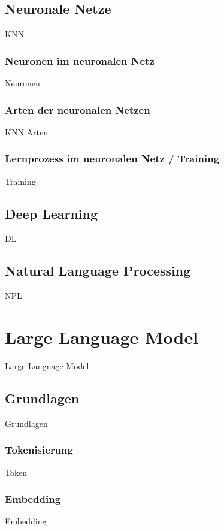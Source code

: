 
\subsection{Neuronale Netze}
KNN

\subsubsection{Neuronen im neuronalen Netz}
Neuronen

\subsubsection{Arten der neuronalen Netzen}
KNN Arten

\subsubsection{Lernprozess im neuronalen Netz / Training}
Training

\subsection{Deep Learning}
DL

\subsection{Natural Language Processing}
NPL

\section{Large Language Model}
Large Language Model

\subsection{Grundlagen}
Grundlagen

\subsubsection{Tokenisierung}
Token

\subsubsection{Embedding}
Embedding

